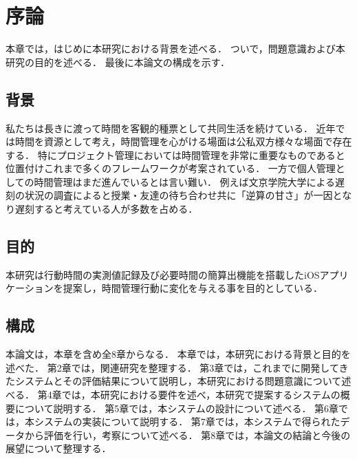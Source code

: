 \chapter{序論}
本章では，はじめに本研究における背景を述べる．
ついで，問題意識および本研究の目的を述べる．
最後に本論文の構成を示す．

\section{背景}

私たちは長きに渡って時間を客観的種票として共同生活を続けている\cite{history}．
近年では時間を資源として考え，時間管理を心がける場面は公私双方様々な場面で存在する．
特にプロジェクト管理においては時間管理を非常に重要なものであると位置付けこれまで多くのフレームワークが考案されている．
一方で個人管理としての時間管理はまだ進んでいるとは言い難い．
例えば文京学院大学による遅刻の状況の調査によると授業・友達の待ち合わせ共に「逆算の甘さ」が一因となり遅刻すると考えている人が多数を占める\cite{bunkyo}．

\section{目的}
本研究は行動時間の実測値記録及び必要時間の簡算出機能を搭載したiOSアプリケーションを提案し，時間管理行動に変化を与える事を目的としている．

\section{構成}
本論文は，本章を含め全8章からなる．
本章では，本研究における背景と目的を述べた．
第2章では，関連研究を整理する．
第3章では，これまでに開発してきたシステムとその評価結果について説明し，本研究における問題意識について述べる．
第4章では，本研究における要件を述べ，本研究で提案するシステムの概要について説明する．
第5章では，本システムの設計について述べる．
第6章では，本システムの実装について説明する．
第7章では，本システムで得られたデータから評価を行い，考察について述べる．
第8章では，本論文の結論と今後の展望について整理する．